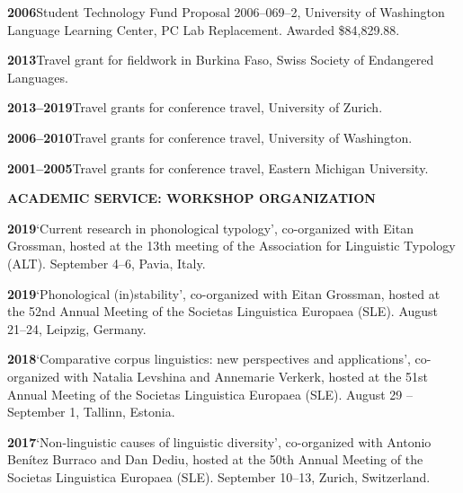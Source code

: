 \documentclass[11pt]{article}
\newcommand{\hangpara}{
 \setlength{\parindent}{0in} %
 \hangindent=0.42in %
}
\begin{document}
\vskip 6pt
\hangpara
{\bf 2006}\hspace{1ex}Student Technology Fund Proposal 2006--069--2, University of Washington Language Learning Center, PC Lab Replacement. Awarded \$84,829.88.

\vskip 6pt
\hangpara
{\bf 2013}\hspace{1ex}Travel grant for fieldwork in Burkina Faso, Swiss Society of Endangered Languages.

\vskip 6pt
\hangpara
{\bf 2013--2019}\hspace{1ex}Travel grants for conference travel, University of Zurich.

\vskip 6pt
\hangpara
{\bf 2006--2010}\hspace{1ex}Travel grants for conference travel, University of Washington.

\vskip 6pt
\hangpara
{\bf 2001--2005}\hspace{1ex}Travel grants for conference travel, Eastern Michigan University.

\vskip 20pt
\begin{flushleft}
{\bf ACADEMIC SERVICE: WORKSHOP ORGANIZATION}
\end{flushleft}


\hangpara
{\bf 2019}\hspace{1ex}`Current research in phonological typology', co-organized with Eitan Grossman, hosted at the 13th meeting of the Association for Linguistic Typology (ALT). September 4--6, Pavia, Italy.

\hangpara
\vskip 6pt
{\bf 2019}\hspace{1ex}`Phonological (in)stability', co-organized with Eitan Grossman, hosted at the 52nd Annual Meeting of the Societas Linguistica Europaea (SLE). August 21--24, Leipzig, Germany.

\hangpara
\vskip 6pt
{\bf 2018}\hspace{1ex}`Comparative corpus linguistics: new perspectives and applications', co-organized with Natalia Levshina and Annemarie Verkerk, hosted at the 51st Annual Meeting of the Societas Linguistica Europaea (SLE). August 29 -- September 1, Tallinn, Estonia.

\hangpara
\vskip 6pt
{\bf 2017}\hspace{1ex}`Non-linguistic causes of linguistic diversity', co-organized with Antonio Benítez Burraco and Dan Dediu, hosted at the 50th Annual Meeting of the Societas Linguistica Europaea (SLE). September 10--13, Zurich, Switzerland.
\end{document}
